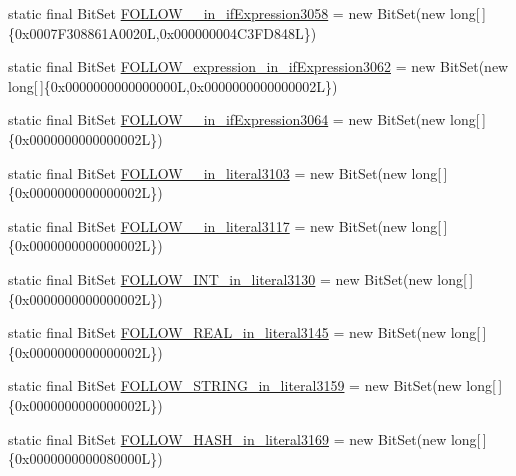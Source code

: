 \begin{DoxyCompactItemize}
\item 
static final Bit\-Set \hyperlink{classorg_1_1tzi_1_1use_1_1parser_1_1shell_1_1_shell_command_parser_a0d019618adf9a830dbc7f88037acc0e0}{F\-O\-L\-L\-O\-W\-\_\-\_\-in\-\_\-if\-Expression3058} = new Bit\-Set(new long\mbox{[}$\,$\mbox{]}\{0x0007\-F308861\-A0020\-L,0x000000004\-C3\-F\-D848\-L\})
\item 
static final Bit\-Set \hyperlink{classorg_1_1tzi_1_1use_1_1parser_1_1shell_1_1_shell_command_parser_a99ec6c80b891d94a64967cc3c12ca319}{F\-O\-L\-L\-O\-W\-\_\-expression\-\_\-in\-\_\-if\-Expression3062} = new Bit\-Set(new long\mbox{[}$\,$\mbox{]}\{0x0000000000000000\-L,0x0000000000000002\-L\})
\item 
static final Bit\-Set \hyperlink{classorg_1_1tzi_1_1use_1_1parser_1_1shell_1_1_shell_command_parser_af65ae1deb80b68af70907c2d5197dde9}{F\-O\-L\-L\-O\-W\-\_\-\_\-in\-\_\-if\-Expression3064} = new Bit\-Set(new long\mbox{[}$\,$\mbox{]}\{0x0000000000000002\-L\})
\item 
static final Bit\-Set \hyperlink{classorg_1_1tzi_1_1use_1_1parser_1_1shell_1_1_shell_command_parser_ab41ed054e4fd5f75ec65a0fe61ad4d0c}{F\-O\-L\-L\-O\-W\-\_\-\_\-in\-\_\-literal3103} = new Bit\-Set(new long\mbox{[}$\,$\mbox{]}\{0x0000000000000002\-L\})
\item 
static final Bit\-Set \hyperlink{classorg_1_1tzi_1_1use_1_1parser_1_1shell_1_1_shell_command_parser_a4048ea5aa7573f8435107b379cc243e0}{F\-O\-L\-L\-O\-W\-\_\-\_\-in\-\_\-literal3117} = new Bit\-Set(new long\mbox{[}$\,$\mbox{]}\{0x0000000000000002\-L\})
\item 
static final Bit\-Set \hyperlink{classorg_1_1tzi_1_1use_1_1parser_1_1shell_1_1_shell_command_parser_ae4bde9c345d6591591b112bee5daafa9}{F\-O\-L\-L\-O\-W\-\_\-\-I\-N\-T\-\_\-in\-\_\-literal3130} = new Bit\-Set(new long\mbox{[}$\,$\mbox{]}\{0x0000000000000002\-L\})
\item 
static final Bit\-Set \hyperlink{classorg_1_1tzi_1_1use_1_1parser_1_1shell_1_1_shell_command_parser_a1c67bf848b309f6f2fdd9e5e8db35cd6}{F\-O\-L\-L\-O\-W\-\_\-\-R\-E\-A\-L\-\_\-in\-\_\-literal3145} = new Bit\-Set(new long\mbox{[}$\,$\mbox{]}\{0x0000000000000002\-L\})
\item 
static final Bit\-Set \hyperlink{classorg_1_1tzi_1_1use_1_1parser_1_1shell_1_1_shell_command_parser_ae4dbdca8abf04cec63590cbdcdc8c9d8}{F\-O\-L\-L\-O\-W\-\_\-\-S\-T\-R\-I\-N\-G\-\_\-in\-\_\-literal3159} = new Bit\-Set(new long\mbox{[}$\,$\mbox{]}\{0x0000000000000002\-L\})
\item 
static final Bit\-Set \hyperlink{classorg_1_1tzi_1_1use_1_1parser_1_1shell_1_1_shell_command_parser_ade39adb819472760736dd2b3eff6de91}{F\-O\-L\-L\-O\-W\-\_\-\-H\-A\-S\-H\-\_\-in\-\_\-literal3169} = new Bit\-Set(new long\mbox{[}$\,$\mbox{]}\{0x0000000000080000\-L\})

\end{DoxyCompactItemize}
